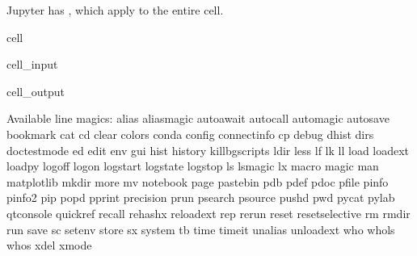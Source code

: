 \documentclass[letterpaper,10pt,english]{jupyterBook}
\begin{document}
\sphinxAtStartPar
Jupyter has , which apply to the entire cell.

\begin{sphinxuseclass}{cell}\begin{sphinxVerbatimInput}

\begin{sphinxuseclass}{cell_input}
\begin{sphinxVerbatim}[commandchars=\\\{\}]
\end{sphinxVerbatim}

\end{sphinxuseclass}\end{sphinxVerbatimInput}
\begin{sphinxVerbatimOutput}

\begin{sphinxuseclass}{cell_output}
\begin{sphinxVerbatim}[commandchars=\\\{\}]
Available line magics:
\PYGZpc{}alias  \PYGZpc{}alias\PYGZus{}magic  \PYGZpc{}autoawait  \PYGZpc{}autocall  \PYGZpc{}automagic  \PYGZpc{}autosave  \PYGZpc{}bookmark  \PYGZpc{}cat  \PYGZpc{}cd  \PYGZpc{}clear  \PYGZpc{}colors  \PYGZpc{}conda  \PYGZpc{}config  \PYGZpc{}connect\PYGZus{}info  \PYGZpc{}cp  \PYGZpc{}debug  \PYGZpc{}dhist  \PYGZpc{}dirs  \PYGZpc{}doctest\PYGZus{}mode  \PYGZpc{}ed  \PYGZpc{}edit  \PYGZpc{}env  \PYGZpc{}gui  \PYGZpc{}hist  \PYGZpc{}history  \PYGZpc{}killbgscripts  \PYGZpc{}ldir  \PYGZpc{}less  \PYGZpc{}lf  \PYGZpc{}lk  \PYGZpc{}ll  \PYGZpc{}load  \PYGZpc{}load\PYGZus{}ext  \PYGZpc{}loadpy  \PYGZpc{}logoff  \PYGZpc{}logon  \PYGZpc{}logstart  \PYGZpc{}logstate  \PYGZpc{}logstop  \PYGZpc{}ls  \PYGZpc{}lsmagic  \PYGZpc{}lx  \PYGZpc{}macro  \PYGZpc{}magic  \PYGZpc{}man  \PYGZpc{}matplotlib  \PYGZpc{}mkdir  \PYGZpc{}more  \PYGZpc{}mv  \PYGZpc{}notebook  \PYGZpc{}page  \PYGZpc{}pastebin  \PYGZpc{}pdb  \PYGZpc{}pdef  \PYGZpc{}pdoc  \PYGZpc{}pfile  \PYGZpc{}pinfo  \PYGZpc{}pinfo2  \PYGZpc{}pip  \PYGZpc{}popd  \PYGZpc{}pprint  \PYGZpc{}precision  \PYGZpc{}prun  \PYGZpc{}psearch  \PYGZpc{}psource  \PYGZpc{}pushd  \PYGZpc{}pwd  \PYGZpc{}pycat  \PYGZpc{}pylab  \PYGZpc{}qtconsole  \PYGZpc{}quickref  \PYGZpc{}recall  \PYGZpc{}rehashx  \PYGZpc{}reload\PYGZus{}ext  \PYGZpc{}rep  \PYGZpc{}rerun  \PYGZpc{}reset  \PYGZpc{}reset\PYGZus{}selective  \PYGZpc{}rm  \PYGZpc{}rmdir  \PYGZpc{}run  \PYGZpc{}save  \PYGZpc{}sc  \PYGZpc{}set\PYGZus{}env  \PYGZpc{}store  \PYGZpc{}sx  \PYGZpc{}system  \PYGZpc{}tb  \PYGZpc{}time  \PYGZpc{}timeit  \PYGZpc{}unalias  \PYGZpc{}unload\PYGZus{}ext  \PYGZpc{}who  \PYGZpc{}who\PYGZus{}ls  \PYGZpc{}whos  \PYGZpc{}xdel  \PYGZpc{}xmode


\end{sphinxVerbatim}
\end{sphinxuseclass}
\end{sphinxVerbatimOutput}
\end{sphinxuseclass}
\end{document}
